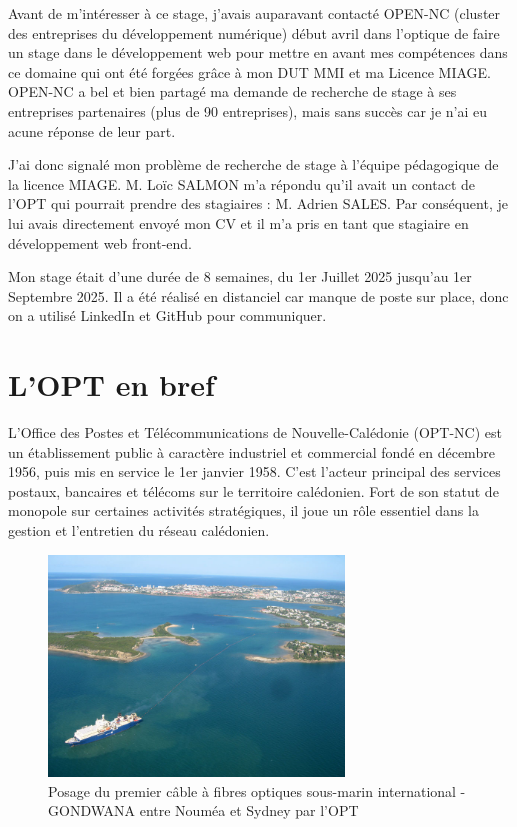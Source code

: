 \documentclass[12pt,a4paper]{report}
\begin{document}
\vspace{1cm}
Avant de m'intéresser à ce stage, j'avais auparavant contacté OPEN-NC (cluster des entreprises du développement numérique) début avril dans l'optique de faire un stage dans le développement web pour mettre en avant mes compétences dans ce domaine qui ont été forgées grâce à mon DUT MMI et ma Licence MIAGE. OPEN-NC a bel et bien partagé ma demande de recherche de stage à ses entreprises partenaires (plus de 90 entreprises), mais sans succès car je n'ai eu acune réponse de leur part.

\vspace{1cm}
J'ai donc signalé mon problème de recherche de stage à l'équipe pédagogique de la licence MIAGE. M. Loïc SALMON m'a répondu qu'il avait un contact de l'OPT qui pourrait prendre des stagiaires : M. Adrien SALES. Par conséquent, je lui avais directement envoyé mon CV et il m'a pris en tant que stagiaire en développement web front-end.

\vspace{1cm}
Mon stage était d'une durée de 8 semaines, du 1er Juillet 2025 jusqu'au 1er Septembre 2025. Il a été réalisé en distanciel car manque de poste sur place, donc on a utilisé LinkedIn et GitHub pour communiquer.


\section{L'OPT en bref}
L’Office des Postes et Télécommunications de Nouvelle-Calédonie (OPT-NC) est un établissement public à caractère industriel et commercial fondé en décembre 1956, puis mis en service le 1er janvier 1958. C'est l’acteur principal des services postaux, bancaires et télécoms sur le territoire calédonien. Fort de son statut de monopole sur certaines activités stratégiques, il joue un rôle essentiel dans la gestion et l'entretien du réseau calédonien.

\vspace{1cm}

\begin{figure}[h] %
    \centering
    \includegraphics[width=0.7\textwidth]{ressources_rapport/pose-cable-gondwana.jpg}
    \caption{Posage du premier câble à fibres optiques sous-marin international - GONDWANA entre Nouméa et Sydney par l'OPT}
\end{figure}
\newpage
\end{document}

